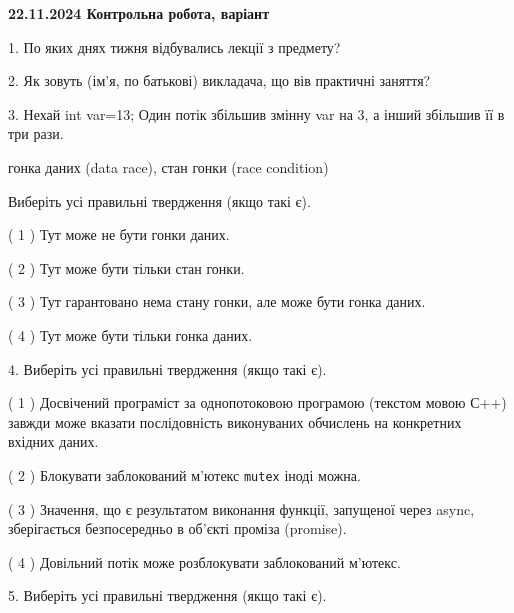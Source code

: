 \documentclass[12pt, ukrainian]{article}
\def\code#1{\Verb!#1!}
\begin{document}
\vspace{4mm}
\newpage
\begin {large}

\textbf{22.11.2024 Контрольна робота, варіант  }\par


{
1. По яких днях тижня відбувались лекції з предмету?



\vspace{5mm}
2. Як зовуть (ім'я, по батькові) викладача, що вів практичні заняття?



\vspace{5mm}
3. Нехай int var=13; Один потік збільшив змінну var на 3, а інший збільшив її в три рази.

гонка даних (data race), стан гонки (race condition)

Виберіть усі правильні твердження (якщо такі є).\par
\vspace{2mm}
( 1 ) Тут може не бути гонки даних.%

( 2 ) Тут може бути тільки стан гонки.%

( 3 ) Тут гарантовано нема стану гонки, але може бути гонка даних.%

( 4 ) Тут може бути тільки гонка даних.%


\vspace{5mm}
4. Виберіть усі правильні твердження (якщо такі є).\par
\vspace{2mm}

( 1 ) Досвічений програміст за однопотоковою програмою (текстом мовою С++) завжди може вказати послідовність виконуваних обчислень на конкретних вхідних даних.%

( 2 ) Блокувати заблокований м’ютекс  \code{mutex} іноді можна.%

( 3 ) Значення, що є результатом виконання функції, запущеної через async, зберігається безпосередньо в об’єкті проміза (promise).%

( 4 ) Довільний потік може розблокувати заблокований м’ютекс.%


\vspace{5mm}
5. Виберіть усі правильні твердження (якщо такі є).\par
\vspace{2mm}

}
\end{large}
\end{document}
